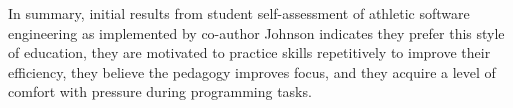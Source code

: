 In summary, initial results from student self-assessment of athletic software engineering as implemented by co-author Johnson indicates they prefer this style of education, they are motivated to practice skills repetitively to improve their efficiency, they believe the pedagogy improves focus, and they acquire a level of comfort with pressure during programming tasks. 






